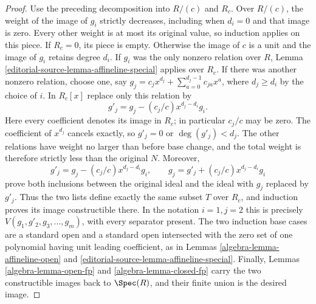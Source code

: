 \begin{proof}
\medskip\noindent
Use the preceding decomposition into $R/(c)$ and $R_c$. Over $R/(c)$,
the weight of the image of $g_i$ strictly decreases, including when
$d_i=0$ and that image is zero. Every other weight is at most its
original value, so induction applies on this piece.
If $R_c=0$, its piece is empty. Otherwise the image of $c$ is a unit
and the image of $g_i$ retains degree $d_i$. If $g_i$ was the only
nonzero relation over $R$, Lemma \ref{editorial-source-lemma-affineline-special}
applies over $R_c$. If there was another nonzero relation, choose
one, say
$g_j=c_jx^{d_j}+\sum_{a=0}^{d_j-1}c_{ja}x^a$, where $d_j\geq d_i$
by the choice of $i$. In $R_c[x]$ replace only this relation by
$$
g'_j=g_j-(c_j/c)x^{d_j-d_i}g_i.
$$
Here every coefficient denotes its image in $R_c$; in particular
$c_j/c$ may be zero. The coefficient of $x^{d_j}$ cancels exactly,
so $g'_j=0$ or $\deg(g'_j)<d_j$. The other relations have weight
no larger than before base change, and the total weight is therefore
strictly less than the original $N$. Moreover,
$$
g'_j=g_j-(c_j/c)x^{d_j-d_i}g_i,\qquad
g_j=g'_j+(c_j/c)x^{d_j-d_i}g_i
$$
prove both inclusions between the original ideal and the ideal with
$g_j$ replaced by $g'_j$. Thus the two lists define exactly the same
subset $T$ over $R_c$, and induction proves its image constructible
there. In the notation $i=1,j=2$ this is precisely
$V(g_1,g'_2,g_3,\ldots,g_m)$, with every separator present.
The two induction base cases are a standard open and a standard open
intersected with the zero set of one polynomial having unit leading
coefficient, as in Lemmas \ref{algebra-lemma-affineline-open} and
\ref{editorial-source-lemma-affineline-special}. Finally,
Lemmas \ref{algebra-lemma-open-fp} and \ref{algebra-lemma-closed-fp} carry the two
constructible images back to $\Spec(R)$, and their finite union is
the desired image.
\end{proof}